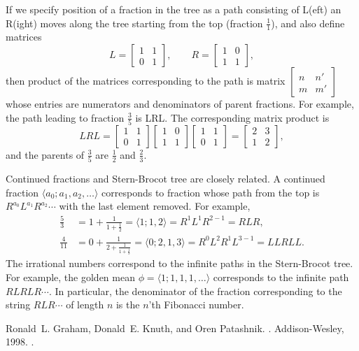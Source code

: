 \documentclass[12pt]{article}
\begin{document}
If we specify position of a fraction in the tree as a path consisting of L(eft) an R(ight) moves along the tree starting from the top (fraction $\frac{1}{1}$), and also define matrices 
\begin{equation*}
L=\begin{bmatrix} 1&1\\0&1 \end{bmatrix},\qquad
R=\begin{bmatrix} 1&0\\1&1 \end{bmatrix},
\end{equation*}
then product of the matrices corresponding to the path is matrix $\left[\begin{smallmatrix}n&n'\\m&m'\end{smallmatrix}\right]$ whose entries are numerators and denominators of parent fractions. For example, the path leading to fraction $\frac{3}{5}$ is LRL. The corresponding matrix product is
\begin{equation*}
LRL=\begin{bmatrix} 1&1\\0&1 \end{bmatrix}\begin{bmatrix} 1&0\\1&1 \end{bmatrix}\begin{bmatrix} 1&1\\0&1 \end{bmatrix}=\begin{bmatrix} 2&3\\1&2 \end{bmatrix},
\end{equation*}
and the parents of $\frac{3}{5}$ are $\frac{1}{2}$ and $\frac{2}{3}$.

Continued fractions and Stern-Brocot tree are closely related. A continued fraction $\langle a_0;a_1,a_2,\dotsc\rangle$ corresponds to fraction whose path from the top is $R^{a_0}L^{a_1}R^{a_2}\dotsb$ with the last element removed. For example,
\begin{align*}
\frac{5}{3}&=1+\frac{1}{1+\frac{1}{2}}=\langle 1;1,2\rangle=R^1L^1R^{2-1}=RLR,\\
\frac{4}{11}&=0+\frac{1}{2+\frac{1}{1+\frac{1}{3}}}=\langle 0;2,1,3\rangle=R^0L^2R^1L^{3-1}=LLRLL.
\end{align*}
The irrational numbers correspond to the infinite paths in the Stern-Brocot tree. For example, the golden mean $\phi=\langle 1;1,1,1,\dotsc\rangle$ corresponds to the infinite path $RLRLR\dotsb$. In particular, the denominator of the fraction corresponding to the string $RLR\dotsb$ of length $n$ is the $n$'th Fibonacci number.

\begin{thebibliography}{1}

Ronald~L. Graham, Donald~E. Knuth, and Oren Patashnik.
.
\newblock Addison-Wesley, 1998.
\newblock {}.

\end{thebibliography}
\end{document}
